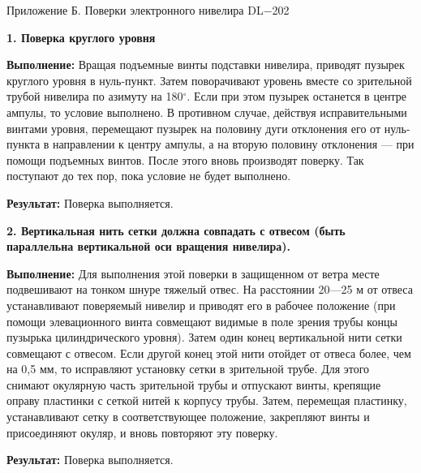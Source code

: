 \documentclass[a4paper]{article}
\begin{document}
\begin{newpage}

    \begin{flushright}
        Приложение Б. Поверки электронного нивелира DL−202
    \end{flushright}
    
    \large{
        \par\textbf{1. Поверка круглого уровня}
        \par\textbf{Выполнение:} Вращая подъемные винты подставки нивелира, приводят пузырек круглого уровня в нуль-пункт. Затем поворачивают уровень вместе со зрительной трубой нивелира по азимуту на 180$^\circ$. Если при этом пузырек останется в центре ампулы, то условие выполнено. В противном случае, действуя исправительными винтами уровня, перемещают пузырек на половину дуги отклонения его от нуль-пункта в направлении к центру ампулы, а на вторую половину отклонения — при помощи подъемных винтов. После этого вновь производят поверку. Так поступают до тех пор, пока условие не будет выполнено.
        \par\textbf{Результат:} Поверка выполняется.\\
    
        \par\textbf{2. Вертикальная нить сетки должна совпадать с отвесом (быть параллельна вертикальной оси вращения нивелира).}
        \par\textbf{Выполнение:} Для выполнения этой поверки в защищенном от ветра месте подвешивают на тонком шнуре тяжелый отвес. На расстоянии 20—25 м от отвеса устанавливают поверяемый нивелир и приводят его в рабочее положение (при помощи элевационного винта совмещают видимые в поле зрения трубы концы пузырька цилиндрического уровня). Затем один конец вертикальной нити сетки совмещают с отвесом. Если другой конец этой нити отойдет от отвеса более, чем на 0,5 мм, то исправляют установку сетки в зрительной трубе. Для этого снимают окулярную часть зрительной трубы и отпускают винты, крепящие оправу пластинки с сеткой нитей к корпусу трубы. Затем, перемещая пластинку, устанавливают сетку в соответствующее положение, закрепляют винты и присоединяют окуляр, и вновь повторяют эту поверку.
        \par\textbf{Результат:} Поверка выполняется.\\
    
}
\end{newpage}
\end{document}

